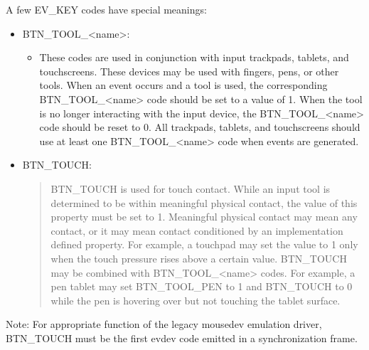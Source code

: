 \documentclass[a4paper,8pt,english]{sphinxmanual}
\begin{document}
A few EV\_KEY codes have special meanings:
\begin{itemize}
\item {} 
BTN\_TOOL\_\textless{}name\textgreater{}:
\begin{itemize}
\item {} 
These codes are used in conjunction with input trackpads, tablets, and
touchscreens. These devices may be used with fingers, pens, or other tools.
When an event occurs and a tool is used, the corresponding BTN\_TOOL\_\textless{}name\textgreater{}
code should be set to a value of 1. When the tool is no longer interacting
with the input device, the BTN\_TOOL\_\textless{}name\textgreater{} code should be reset to 0. All
trackpads, tablets, and touchscreens should use at least one BTN\_TOOL\_\textless{}name\textgreater{}
code when events are generated.

\end{itemize}

\item {} 
BTN\_TOUCH:
\begin{quote}

BTN\_TOUCH is used for touch contact. While an input tool is determined to be
within meaningful physical contact, the value of this property must be set
to 1. Meaningful physical contact may mean any contact, or it may mean
contact conditioned by an implementation defined property. For example, a
touchpad may set the value to 1 only when the touch pressure rises above a
certain value. BTN\_TOUCH may be combined with BTN\_TOOL\_\textless{}name\textgreater{} codes. For
example, a pen tablet may set BTN\_TOOL\_PEN to 1 and BTN\_TOUCH to 0 while the
pen is hovering over but not touching the tablet surface.
\end{quote}

\end{itemize}

Note: For appropriate function of the legacy mousedev emulation driver,
BTN\_TOUCH must be the first evdev code emitted in a synchronization frame.
\end{document}
